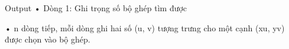 Output
• Dòng 1: Ghi trọng số bộ ghép tìm được   


   • n dòng tiếp, mỗi dòng ghi hai số (u, v) tượng trưng cho một cạnh (xu, yv) được chọn vào bộ ghép.